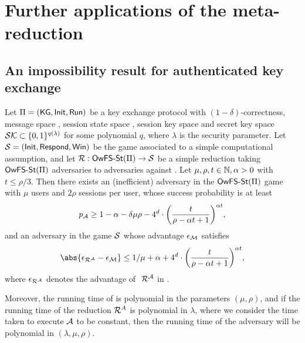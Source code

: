 
\section{Further applications of the meta-reduction}

\subsection{An impossibility result for authenticated key exchange}

\begin{theorem}\label{thm:owfsst}
  Let \(\mathrm{\Pi}{} = (\mathsf{KG}, \mathsf{Init}, \mathsf{Run})\) be a key exchange protocol
  with \((1-\delta)\)-correctness,
  message space \setM, session state space \setST, session key space \keyspace
  and secret key space \(\mathcal{SK} \subset \{0,1\}^{q(\lambda)}\) for some polynomial \(q\),
  where \(\lambda\) is the security parameter.
  Let \(\mathcal{S} = (\mathsf{Init}, \mathsf{Respond}, \mathsf{Win})\) be the game associated to a simple computational assumption,
  and let \(\redR : \OwFSst(\prot) \to \Simple\) be a simple reduction
  taking \(\mathsf{OwFS}\text{-}\mathsf{St}(\mathrm{\Pi})\) adversaries to adversaries against \Simple.
  Let \(\mu,\rho,t \in \mathbb{N}, \alpha > 0\) with \(t \le \rho/3\).
  Then there exists an (inefficient) adversary \advA in the \(\mathsf{OwFS}\text{-}\mathsf{St}(\mathrm{\Pi})\) game
  with \(\mu\) users and \(2\rho\) sessions per user, whose success probability is at least
  \begin{equation}\label{ineq:owfsst:A}
    p_{\advA} \ge 1 - \alpha - \delta \mu \rho
    - 4^{d} \cdot \left( \frac{t}{\rho - \alpha t + 1} \right)^{\alpha t},
  \end{equation}
  and an adversary \redM in the game \(\mathcal{S}\)
  whose advantage \(\epsilon_{\mathcal{M}}\) satisfies
  \begin{equation}\label{ineq:owfsst:M}
    \abs{\epsilon_{\redR^{\advA}} - \epsilon_{\redM}} \le 1/\mu + \alpha
    + 4^{d} \cdot \left( \frac{t}{\rho - \alpha t + 1} \right)^{\alpha t},
  \end{equation}
  where \(\epsilon_{\redR^{\advA}}\) denotes the advantage of \(\text{ }\redR^{\advA}\) in \Simple.

  Moreover, the running time of \redM is polynomial in the parameters \((\mu, \rho)\),
  and if the running time of the reduction \(\redR^{A}\) is polynomial in \(\lambda\),
  where we consider the time taken to execute \(\mathcal{A}\) to be constant,
  then the running time of the adversary \redM will be polynomial in \((\lambda,\mu,\rho)\).
\end{theorem}

